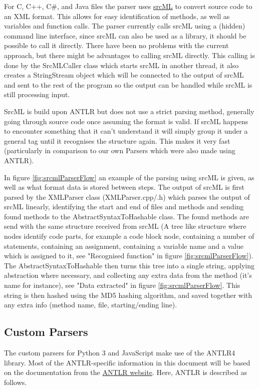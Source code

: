 \documentclass[../Main.tex]{subfiles}
\begin{document}
For C, C++, C\#, and Java files the parser uses \href{https://www.srcml.org/}{srcML} to convert source code to an XML format. This allows for easy identification of methods, as well as variables and function calls. The parser currently calls srcML using a (hidden) command line interface, since srcML can also be used as a library, it should be possible to call it directly. There have been no problems with the current approach, but there might be advantages to calling srcML directly. This calling is done by the SrcMLCaller class which starts srcML in another thread, it also creates a StringStream object which will be connected to the output of srcML and sent to the rest of the program so the output can be handled while srcML is still processing input.

SrcML is build upon ANTLR but does not use a strict parsing method, generally going through source code once assuming the format is valid. If srcML happens to encounter something that it can't understand it will simply group it under a general tag until it recognises the structure again. This makes it very fast (particularly in comparison to our own Parsers which were also made using ANTLR).

In figure \ref{fig:srcmlParserFlow} an example of the parsing using srcML is given, as well as what format data is stored between steps. The output of srcML is first parsed by the XMLParser class (XMLParser.cpp/.h) which parses the output of srcML linearly, identifying the start and end of files and methods and sending found methods to the AbstractSyntaxToHashable class. The found methods are send with the same structure received from srcML (A tree like structure where nodes identify code parts, for example a code block node, containing a number of statements, containing an assignment, containing a variable name and a value which is assigned to it, see "Recognised function" in figure \ref{fig:srcmlParserFlow}). The AbstractSyntaxToHashable then turns this tree into a single string, applying abstraction where necessary, and collecting any extra data from the method (it's name for instance), see "Data extracted" in figure \ref{fig:srcmlParserFlow}. This string is then hashed using the MD5 hashing algorithm, and saved together with any extra info (method name, file, starting/ending line).


\newpage
\subsection{Custom Parsers}
The custom parsers for Python 3 and JavaScript make use of the ANTLR4 library. Most of the ANTLR-specific information in this document will be based on the documentation from the \href{https://www.antlr.org/}{ANTLR website}. Here, ANTLR is described as follows.
\end{document}

